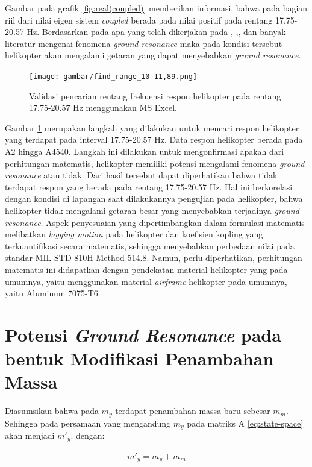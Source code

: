 Gambar pada grafik \ref{fig:real(coupled)} memberikan informasi, bahwa pada bagian riil dari nilai eigen sistem \textit{coupled} berada pada nilai positif pada rentang 17.75-20.57 Hz. Berdasarkan pada apa yang telah dikerjakan pada \cite{BERGEOT201672}, \cite{Eckert2007AnalyticalAA},\cite{Bergeot_passive}, dan banyak literatur mengenai fenomena \textit{ground resonance} maka pada kondisi tersebut helikopter akan mengalami getaran yang dapat menyebabkan \textit{ground resonance}. 

\begin{figure}[H]
	\centering
	\texttt{[image: gambar/find\_range\_10-11,89.png]}
	\caption{Validasi pencarian rentang frekuensi respon helikopter pada rentang 17.75-20.57 Hz menggunakan MS Excel.}
	\label{fig:resonance_range}
\end{figure}

Gambar \ref{fig:resonance_range} merupakan langkah yang dilakukan untuk mencari respon helikopter yang terdapat pada interval 17.75-20.57 Hz. Data respon helikopter berada pada A2 hingga A4540. Langkah ini dilakukan untuk mengonfirmasi apakah dari perhitungan matematis, helikopter memiliki potensi mengalami fenomena \textit{ground resonance} atau tidak. Dari hasil tersebut dapat diperhatikan bahwa tidak terdapat respon yang berada pada rentang 17.75-20.57 Hz. Hal ini berkorelasi dengan kondisi di lapangan saat dilakukannya pengujian pada helikopter, bahwa helikopter tidak mengalami getaran besar yang menyebabkan terjadinya \textit{ground resonance}. Aspek penyesuaian yang dipertimbangkan dalam formulasi matematis melibatkan \textit{lagging motion} pada helikopter dan koefisien kopling yang terkuantifikasi secara matematis, sehingga menyebabkan perbedaan nilai pada standar MIL-STD-810H-Method-514.8. Namun, perlu diperhatikan, perhitungan matematis ini didapatkan dengan pendekatan material helikopter yang pada umumnya, yaitu menggunakan material \textit{airframe} helikopter pada umumnya, yaitu Aluminum 7075-T6 \cite{ASTM}.

\section{Potensi \textit{Ground Resonance} pada bentuk Modifikasi Penambahan Massa}

Diasumsikan bahwa pada $m_y$ terdapat penambahan massa baru sebesar $m_m$. Sehingga pada persamaan yang mengandung $m_y$ pada matriks A \ref{eq:state-space} akan menjadi $m'_y$. dengan:

\begin{align}
	\label{eq:modified}
	m'_y=m_y+m_m
\end{align}

